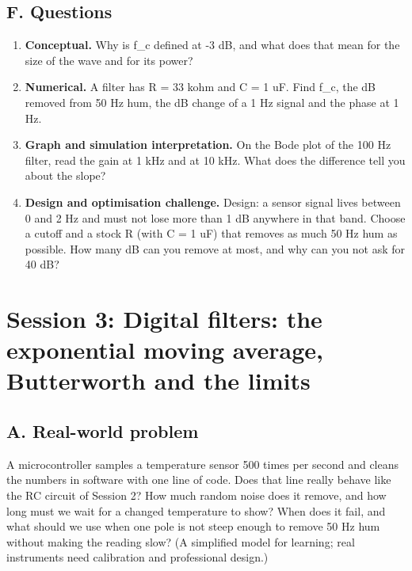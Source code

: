 \documentclass[11pt,a4paper]{article}
\begin{document}
\subsection*{F. Questions}
\begin{enumerate}[nosep]
\item \textbf{Conceptual.} Why is f\_c defined at -3 dB, and what does that mean for the size of the wave and for its power?
\item \textbf{Numerical.} A filter has R = 33 kohm and C = 1 uF. Find f\_c, the dB removed from 50 Hz hum, the dB change of a 1 Hz signal and the phase at 1 Hz.
\item \textbf{Graph and simulation interpretation.} On the Bode plot of the 100 Hz filter, read the gain at 1 kHz and at 10 kHz. What does the difference tell you about the slope?
\item \textbf{Design and optimisation challenge.} Design: a sensor signal lives between 0 and 2 Hz and must not lose more than 1 dB anywhere in that band. Choose a cutoff and a stock R (with C = 1 uF) that removes as much 50 Hz hum as possible. How many dB can you remove at most, and why can you not ask for 40 dB?
\end{enumerate}

\section{Session 3: Digital filters: the exponential moving average, Butterworth and the limits}

\subsection*{A. Real-world problem}
A microcontroller samples a temperature sensor 500 times per second and cleans the numbers in software with one line of code. Does that line really behave like the RC circuit of Session 2? How much random noise does it remove, and how long must we wait for a changed temperature to show? When does it fail, and what should we use when one pole is not steep enough to remove 50 Hz hum without making the reading slow? (A simplified model for learning; real instruments need calibration and professional design.)
\end{document}
